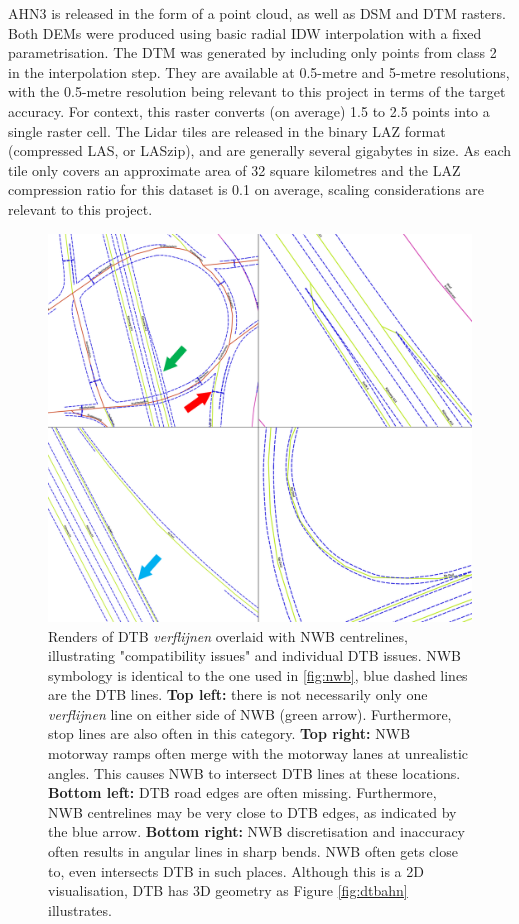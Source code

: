 AHN3 is released in the form of a point cloud, as well as DSM and DTM rasters. Both DEMs were produced using basic radial IDW interpolation with a fixed parametrisation. The DTM was generated by including only points from class 2 in the interpolation step. They are available at 0.5-metre and 5-metre resolutions, with the 0.5-metre resolution being relevant to this project in terms of the target accuracy. For context, this raster converts (on average) 1.5 to 2.5 points into a single raster cell. The Lidar tiles are released in the binary LAZ format (compressed LAS, or LASzip), and are generally several gigabytes in size. As each tile only covers an approximate area of 32 square kilometres and the LAZ compression ratio for this dataset is 0.1 on average, scaling considerations are relevant to this project.

\begin{figure}[h!]
    \centering
    \includegraphics[width=0.95\linewidth]{p2/figs/dtb_sample_07.png} 
    \caption{Renders of DTB \textit{verflijnen} overlaid with NWB centrelines, illustrating "compatibility issues" and individual DTB issues. NWB symbology is identical to the one used in \ref{fig:nwb}, blue dashed lines are the DTB lines. \textbf{Top left:} there is not necessarily only one \textit{verflijnen} line on either side of NWB (green arrow). Furthermore, stop lines are also often in this category. \textbf{Top right:} NWB motorway ramps often merge with the motorway lanes at unrealistic angles. This causes NWB to intersect DTB lines at these locations. \textbf{Bottom left:} DTB road edges are often missing. Furthermore, NWB centrelines may be very close to DTB edges, as indicated by the blue arrow. \textbf{Bottom right:} NWB discretisation and inaccuracy often results in angular lines in sharp bends. NWB often gets close to, even intersects DTB in such places. Although this is a 2D visualisation, DTB has 3D geometry as Figure \ref{fig:dtbahn} illustrates.}
    \label{fig:dtbnwb}
\end{figure}

